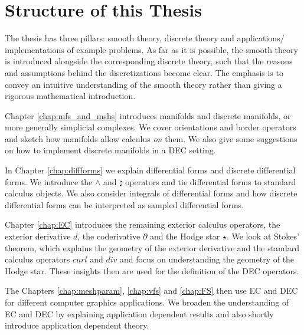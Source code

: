 \section{Structure of this Thesis}
The thesis has three pillars: smooth theory, discrete theory and applications/ implementations of example problems. As far as it is possible, the smooth theory is introduced alongside the corresponding discrete theory, such that the reasons and assumptions behind the discretizations become clear. The emphasis is to convey an intuitive understanding of the smooth theory rather than giving a rigorous mathematical introduction. 

Chapter \ref{chap:mfs_and_mshs} introduces manifolds and discrete manifolds, or more generally simplicial complexes. We cover orientations and border operators and sketch how manifolds allow calculus \emph{on} them. We also give some suggestions on how to implement discrete manifolds in a DEC setting.

In Chapter \ref{chap:diffforms} we explain differential forms and discrete differential forms. We introduce the $\wedge$ and $\sharp$ operators and tie  differential forms to standard calculus objects. We also consider integrals of differential forms and how discrete differential forms can be interpreted as sampled differential forms.

Chapter \ref{chap:EC} introduces the remaining exterior calculus operators, the exterior derivative $d$, the coderivative $\partial$ and the Hodge star $\star$. We look at Stokes' theorem, which explains the geometry of the exterior derivative and the standard calculus operators $curl$ and $div$ and focus on understanding the geometry of the Hodge star. These insights then are used for the definition of the DEC operators. 

The Chapters \ref{chap:meshparam}, \ref{chap:vfs} and \ref{chap:FS} then use EC and DEC for different computer graphics applications. We broaden the understanding of EC and DEC by explaining application dependent results and also shortly introduce application dependent theory.


